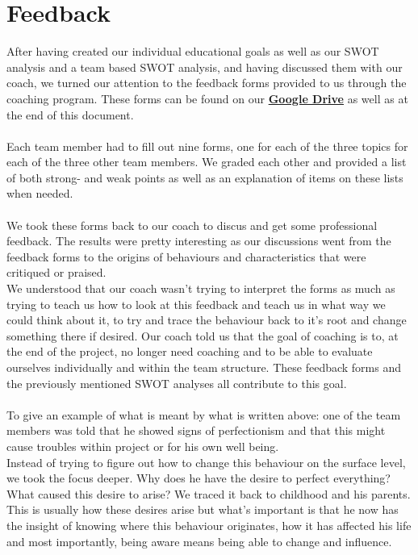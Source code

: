 \documentclass[12pt]{article}
\begin{document}
	\section{Feedback}
	After having created our individual educational goals as well as our SWOT analysis and a team based SWOT analysis, and having discussed them with our coach, we turned our attention to the feedback forms provided to us through the coaching program. These forms can be found on our \href{https://drive.google.com/drive/folders/1IJEu7igVdK12MzVx3jkXZMvB5HUXFuYZ?usp=sharing}{\textbf{Google Drive}} as well as at the end of this document.\\
	\\Each team member had to fill out nine forms, one for each of the three topics for each of the three other team members. We graded each other and provided a list of both strong- and weak points as well as an explanation of items on these lists when needed.\\
	\\We took these forms back to our coach to discus and get some professional feedback. The results were pretty interesting as our discussions went from the feedback forms to the origins of behaviours and characteristics that were critiqued or praised.\\
	We understood that our coach wasn't trying to interpret the forms as much as trying to teach us how to look at this feedback and teach us in what way we could think about it, to try and trace the behaviour back to it's root and change something there if desired. Our coach told us that the goal of coaching is to, at the end of the project, no longer need coaching and to be able to evaluate ourselves individually and within the team structure. These feedback forms and the previously mentioned SWOT analyses all contribute to this goal.\\
	\\To give an example of what is meant by what is written above: one of the team members was told that he showed signs of perfectionism and that this might cause troubles within project or for his own well being.\\
	Instead of trying to figure out how to change this behaviour on the surface level, we took the focus deeper. Why does he have the desire to perfect everything? What caused this desire to arise? We traced it back to childhood and his parents. This is usually how these desires arise but what's important is that he now has the insight of knowing where this behaviour originates, how it has affected his life and most importantly, being aware means being able to change and influence.
	\newpage
\end{document}
